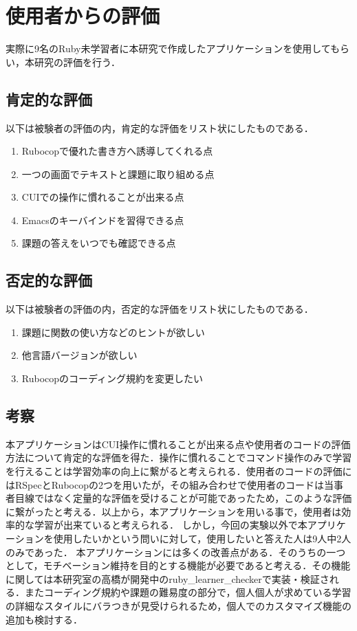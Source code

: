 \chapter{使用者からの評価}\label{evaluation}
実際に9名のRuby未学習者に本研究で作成したアプリケーションを使用してもらい，本研究の評価を行う．

\section{肯定的な評価}\label{list}
以下は被験者の評価の内，肯定的な評価をリスト状にしたものである．
\begin{enumerate}
\def\labelenumi{\arabic{enumi}.}
\tightlist
\item
  Rubocopで優れた書き方へ誘導してくれる点
\item
  一つの画面でテキストと課題に取り組める点
\item
  CUIでの操作に慣れることが出来る点
\item
  Emacsのキーバインドを習得できる点
\item
  課題の答えをいつでも確認できる点
\end{enumerate}

\section{否定的な評価}\label{list}
以下は被験者の評価の内，否定的な評価をリスト状にしたものである．
\begin{enumerate}
\def\labelenumi{\arabic{enumi}.}
\tightlist
\item
  課題に関数の使い方などのヒントが欲しい
\item
  他言語バージョンが欲しい
\item
  Rubocopのコーディング規約を変更したい
\end{enumerate}

\section{考察}\label{list}
本アプリケーションはCUI操作に慣れることが出来る点や使用者のコードの評価方法について肯定的な評価を得た．操作に慣れることでコマンド操作のみで学習を行えることは学習効率の向上に繋がると考えられる．使用者のコードの評価にはRSpecとRubocopの2つを用いたが，その組み合わせで使用者のコードは当事者目線ではなく定量的な評価を受けることが可能であったため，このような評価に繋がったと考える．以上から，本アプリケーションを用いる事で，使用者は効率的な学習が出来ていると考えられる．
しかし，今回の実験以外で本アプリケーションを使用したいかという問いに対して，使用したいと答えた人は9人中2人のみであった．
本アプリケーションには多くの改善点がある．そのうちの一つとして，モチベーション維持を目的とする機能が必要であると考える．その機能に関しては本研究室の高橋が開発中のruby\_learner\_checkerで実装・検証される．またコーディング規約や課題の難易度の部分で，個人個人が求めている学習の詳細なスタイルにバラつきが見受けられるため，個人でのカスタマイズ機能の追加も検討する．
